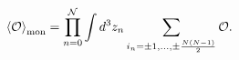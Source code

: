 \begin{equation}
\label{monav}
\left<{\cal O}\right>_{\rm mon}=
\prod\limits_{n=0}^{\cal N}\int d^3z_n
\sum\limits_{i_n=\pm 1,\ldots,\pm\frac{N(N-1)}{2}}^{}{\cal O}.
\end{equation}

